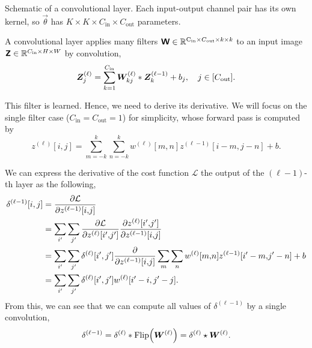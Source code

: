 \begin{marginfigure}
    \centering
    \caption{Schematic of a convolutional layer. Each input-output channel pair has its own kernel,
        so $\vec{\theta}$ has $K\times K \times C_{\mathrm{in}} \times C_{\mathrm{out}}$ parameters.}
    \label{fig:convolutional-layer}
\end{marginfigure}

A convolutional layer applies many filters $\bm{\mathsf{W}} \in \mathbb{R}^{\mathrm{C_{in}} \times
        C_{\mathrm{out}} \times k \times k}$ to an input image $\bm{\mathsf{Z}} \in \mathbb{R}^{C_{\mathrm{in}} \times H
        \times W}$ by convolution, \[
    \bm{Z}^{(\ell)}_j = \sum_{k=1}^{C_{\mathrm{in}}} \bm{W}^{(\ell)}_{kj} * \bm{Z}^{(\ell - 1)}_k + b_j, \quad j \in [C_{\mathrm{out}}].
\]

This filter is learned. Hence, we need to derive its derivative. We will focus on the single filter
case ($C_{\mathrm{in}} = C_{\mathrm{out}} = 1$) for simplicity, whose forward pass is computed by \[
    z^{(\ell)}[i,j] = \sum_{m=-k}^{k} \sum_{n=-k}^{k} w^{(\ell)}[m,n] z^{(\ell-1)}[i-m,j-n] + b.
\]

We can express the derivative of the cost function $\mathcal{L}$ \wrt the output of the
$(\ell-1)$-th layer as the following,
\begin{align*}
    \delta^{(\ell-1)}[i,j] & = \pdv{\mathcal{L}}{z^{(\ell-1)}[i{,}j]}                                                                                                   \\
                           & = \sum_{i'} \sum_{j'} \pdv{\mathcal{L}}{z^{(\ell)}[i'{,}j']} \pdv{z^{(\ell)}[i'{,}j']}{z^{(\ell-1)}[i{,}j]}                                \\
                           & = \sum_{i'} \sum_{j'} \delta^{(\ell)}[i',j'] \pdv*{\sum_{m} \sum_{n} w^{(\ell)}[m{,}n] z^{(\ell-1)}[i'-m{,}j'-n] + b}{z^{(\ell-1)}[i{,}j]} \\
                           & = \sum_{i'} \sum_{j'} \delta^{(\ell)}[i',j'] w^{(\ell)}[i'-i,j'-j].
\end{align*}
From this, we can see that we can compute all values of $\delta^{(\ell-1)}$ by a single convolution, \[
    \delta^{(\ell-1)} = \delta^{(\ell)} * \mathrm{Flip}\lft( \mat{W}^{(\ell)} \rgt) = \delta^{(\ell)} \star \mat{W}^{(\ell)}.
\]


